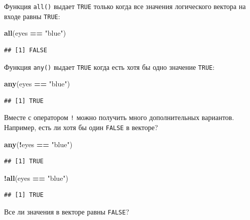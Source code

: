 \documentclass[]{book}
\newenvironment{Shaded}{\begin{snugshade}}{\end{snugshade}}
\newcommand{\KeywordTok}[1]{\textcolor[rgb]{0.13,0.29,0.53}{\textbf{#1}}}
\newcommand{\StringTok}[1]{\textcolor[rgb]{0.31,0.60,0.02}{#1}}
\newcommand{\OperatorTok}[1]{\textcolor[rgb]{0.81,0.36,0.00}{\textbf{#1}}}
\newcommand{\NormalTok}[1]{#1}
\begin{document}
Функция \texttt{all()} выдает \texttt{TRUE} только когда все значения
логического вектора на входе равны \texttt{TRUE}:

\begin{Shaded}
\begin{Highlighting}[]
\KeywordTok{all}\NormalTok{(eyes }\OperatorTok{==}\StringTok{ "blue"}\NormalTok{)}
\end{Highlighting}
\end{Shaded}

\begin{verbatim}
## [1] FALSE
\end{verbatim}

Функция \texttt{any()} выдает \texttt{TRUE} когда есть хотя бы одно
значение \texttt{TRUE}:

\begin{Shaded}
\begin{Highlighting}[]
\KeywordTok{any}\NormalTok{(eyes }\OperatorTok{==}\StringTok{ "blue"}\NormalTok{)}
\end{Highlighting}
\end{Shaded}

\begin{verbatim}
## [1] TRUE
\end{verbatim}

Вместе с оператором \texttt{!} можно получить много дополнительных
вариантов. Например, есть ли хотя бы один \texttt{FALSE} в векторе?

\begin{Shaded}
\begin{Highlighting}[]
\KeywordTok{any}\NormalTok{(}\OperatorTok{!}\NormalTok{eyes }\OperatorTok{==}\StringTok{ "blue"}\NormalTok{)}
\end{Highlighting}
\end{Shaded}

\begin{verbatim}
## [1] TRUE
\end{verbatim}

\begin{Shaded}
\begin{Highlighting}[]
\OperatorTok{!}\KeywordTok{all}\NormalTok{(eyes }\OperatorTok{==}\StringTok{ "blue"}\NormalTok{)}
\end{Highlighting}
\end{Shaded}

\begin{verbatim}
## [1] TRUE
\end{verbatim}

Все ли значения в векторе равны \texttt{FALSE}?
\end{document}
